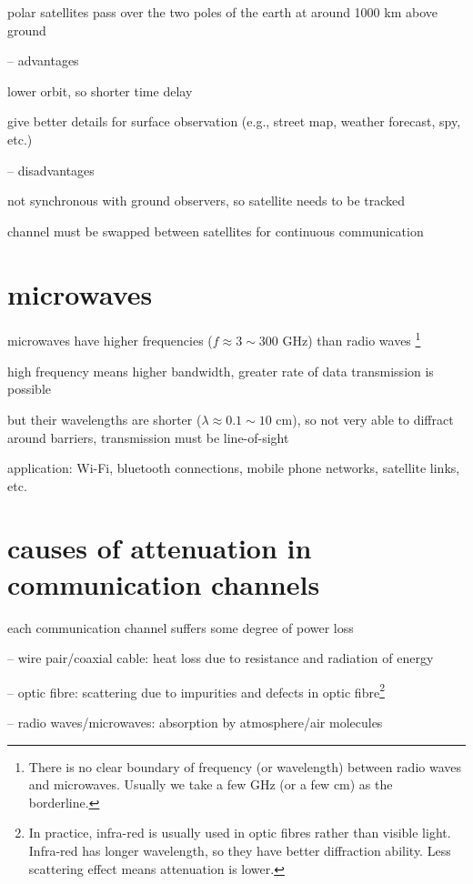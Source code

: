 polar satellites pass over the two poles of the earth at around 1000 km above ground

\begin{compactitem}
	\item[--] advantages
	
	lower orbit, so shorter time delay
	
	give better details for surface observation (e.g., street map, weather forecast, spy, etc.)
	
	\item[--] disadvantages
	
	not synchronous with ground observers, so satellite needs to be tracked
	
	channel must be swapped between satellites for continuous communication
\end{compactitem}



\section{microwaves}

microwaves have higher frequencies ($f\approx 3 \sim 300 \text{ GHz} $)  than radio waves \footnote{There is no clear boundary of frequency (or wavelength) between radio waves and microwaves. Usually we take a few GHz (or a few cm) as the borderline.}

high frequency means higher bandwidth, greater rate of data transmission is possible

but their wavelengths are shorter ($\lambda \approx 0.1 \sim 10 \text{ cm}$), so not very able to diffract around barriers, transmission must be line-of-sight

\cmt application: Wi-Fi, bluetooth connections, mobile phone networks, satellite links, etc.



\section*{causes of attenuation in communication channels}

each communication channel suffers some degree of power loss

\begin{compactitem}
	\item[--] wire pair/coaxial cable: heat loss due to resistance and radiation of energy
	
	\item[--] optic fibre: scattering due to impurities and defects in optic fibre\footnote{In practice, infra-red is usually used in optic fibres rather than visible light. Infra-red has longer wavelength, so they have better diffraction ability. Less scattering effect means attenuation is lower.}
	
	\item[--] radio waves/microwaves: absorption by atmosphere/air molecules
\end{compactitem}



